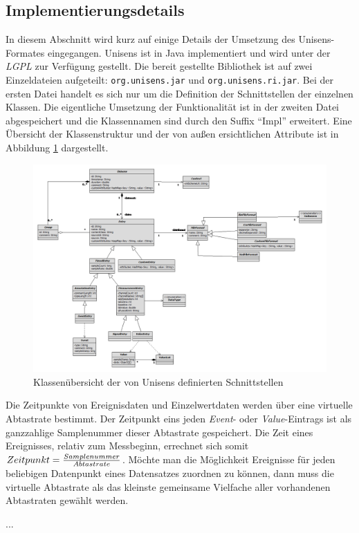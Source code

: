 \subsection{Implementierungsdetails}

In diesem Abschnitt wird kurz auf einige Details der Umsetzung des Unisens-Formates eingegangen.
Unisens ist in Java implementiert und wird unter der \emph{\ac{LGPL}} zur Verf\"ugung gestellt.
Die bereit gestellte Bibliothek ist auf zwei Einzeldateien aufgeteilt: \verb|org.unisens.jar| und \verb|org.unisens.ri.jar|.
Bei der ersten Datei handelt es sich nur um die Definition der Schnittstellen der einzelnen Klassen.
Die eigentliche Umsetzung der Funktionalit\"at ist in der zweiten Datei abgespeichert und die Klassennamen sind durch den Suffix "`Impl"' erweitert.
Eine \"Ubersicht der Klassenstruktur und der von au\ss en ersichtlichen Attribute ist in Abbildung \ref{pic:unisens_interface} dargestellt.

\begin{figure}
\includegraphics[width=\textwidth]{bilder/unisens_interface.png}
\caption{Klassen\"ubersicht der von Unisens definierten Schnittstellen}
\label{pic:unisens_interface}
\end{figure}

Die Zeitpunkte von Ereignisdaten und Einzelwertdaten werden \"uber eine virtuelle Abtastrate bestimmt.
Der Zeitpunkt eins jeden \emph{Event}- oder \emph{Value}-Eintrags ist als ganzzahlige Samplenummer dieser Abtastrate gespeichert.
Die Zeit eines Ereignisses, relativ zum Messbeginn, errechnet sich somit $Zeitpunkt = {Samplenummer \over Abtastrate}$.
M\"ochte man die M\"oglichkeit Ereignisse f\"ur jeden beliebigen Datenpunkt eines Datensatzes zuordnen zu k\"onnen, dann muss die virtuelle Abtastrate als das kleinste gemeinsame Vielfache aller vorhandenen Abtastraten gew\"ahlt werden.

...

